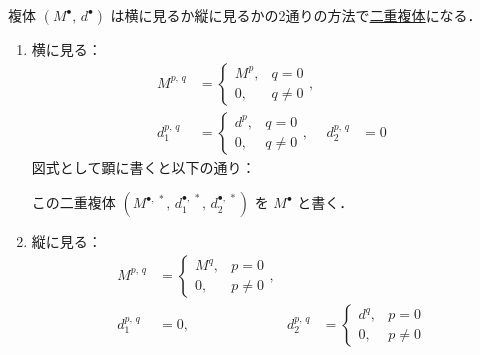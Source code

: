 \documentclass[algtopo_main]{subfiles}
\begin{document}
複体 $(M^\bullet,\, d^\bullet)$ は横に見るか縦に見るかの2通りの方法で\hyperref[def:double-complex]{二重複体}になる．

\begin{enumerate}
    \item 横に見る：
    \begin{align}
        M^{p,\, q} &= 
        \begin{cases}
            M^p, &q = 0 \\
            0, &q \neq 0 
        \end{cases}, & & \\
        d_1^{p,\, q} &=
        \begin{cases}
            d^p, &q=0 \\
            0, &q \neq 0
        \end{cases}, &
        d_2^{p,\, q} &= 0
    \end{align}
    図式として顕に書くと以下の通り：
    \begin{center}
    \end{center}
    この二重複体 $(M^{\bullet,\, *},\, d_1^{\bullet,\, *},\, d_2^{\bullet,\, *})$ を $M^\bullet$ と書く．
    \item 縦に見る：
    \begin{align}
        M^{p,\, q} &= 
        \begin{cases}
            M^q, &p = 0 \\
            0, &p \neq 0 
        \end{cases}, & & \\
        d_1^{p,\, q} &= 0, &
        d_2^{p,\, q} &=
        \begin{cases}
            d^q, &p=0 \\
            0, &p \neq 0
        \end{cases}
    \end{align}

\end{enumerate}
\end{document}
